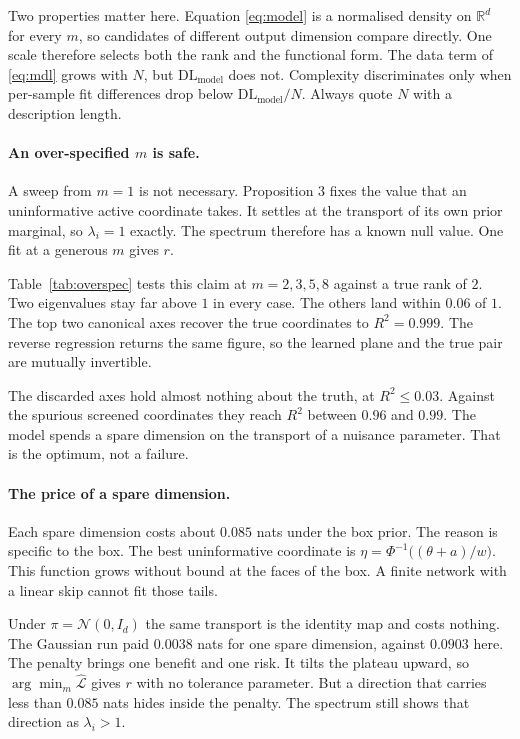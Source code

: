 \documentclass[11pt, letterpaper]{article}
\theoremstyle{definition}
\begin{document}
Two properties matter here. Equation \eqref{eq:model} is a normalised density on
$\mathbb{R}^d$ for every $m$, so candidates of different output dimension
compare directly. One scale therefore selects both the rank and the functional
form. The data term of \eqref{eq:mdl} grows with $N$, but
$\mathrm{DL}_{\mathrm{model}}$ does not. Complexity discriminates only when
per-sample fit differences drop below $\mathrm{DL}_{\mathrm{model}}/N$. Always
quote $N$ with a description length.

\paragraph{An over-specified $m$ is safe.}
A sweep from $m=1$ is not necessary. Proposition 3 fixes the value that an
uninformative active coordinate takes. It settles at the transport of its own
prior marginal, so $\lambda_i=1$ exactly. The spectrum therefore has a known
null value. One fit at a generous $m$ gives $r$.

Table~\ref{tab:overspec} tests this claim at $m=2,3,5,8$ against a true rank of
$2$. Two eigenvalues stay far above $1$ in every case. The others land within
$0.06$ of $1$. The top two canonical axes recover the true coordinates to
$R^2=0.999$. The reverse regression returns the same figure, so the learned
plane and the true pair are mutually invertible.

The discarded axes hold almost nothing about the truth, at $R^2\le0.03$. Against
the spurious screened coordinates they reach $R^2$ between $0.96$ and $0.99$.
The model spends a spare dimension on the transport of a nuisance parameter.
That is the optimum, not a failure.

\paragraph{The price of a spare dimension.}
Each spare dimension costs about $0.085$ nats under the box prior. The reason is
specific to the box. The best uninformative coordinate is
$\eta=\Phi^{-1}\bigl((\theta+a)/w\bigr)$. This function grows without bound at
the faces of the box. A finite network with a linear skip cannot fit those
tails.

Under $\pi=\mathcal{N}(0,I_d)$ the same transport is the identity map and costs
nothing. The Gaussian run paid $0.0038$ nats for one spare dimension, against
$0.0903$ here. The penalty brings one benefit and one risk. It tilts the plateau
upward, so $\arg\min_m\hat{\mathcal{L}}$ gives $r$ with no tolerance parameter.
But a direction that carries less than $0.085$ nats hides inside the penalty.
The spectrum still shows that direction as $\lambda_i>1$.
\end{document}
